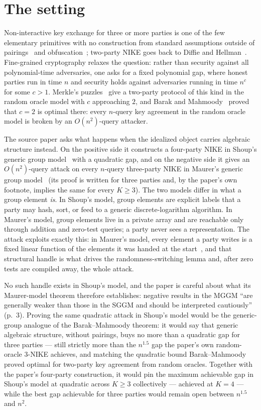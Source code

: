\documentclass{aicr-conjecture}
\begin{document}
\section{The setting}\label{sec:setting}

Non-interactive key exchange for three or more parties is one of the few
elementary primitives with no construction from standard assumptions
outside of pairings~\cite{Jou00} and obfuscation~\cite{BZ14}; two-party
NIKE goes back to Diffie and Hellman~\cite{DH76}. Fine-grained
cryptography relaxes the question: rather than security against all
polynomial-time adversaries, one asks for a fixed polynomial gap, where
honest parties run in time $n$ and security holds against adversaries
running in time $n^{c}$ for some $c > 1$. Merkle's puzzles~\cite{Mer78}
give a two-party protocol of this kind in the random oracle model with
$c$ approaching $2$, and Barak and Mahmoody~\cite{BM09,BM17} proved that
$c = 2$ is optimal there: every $n$-query key agreement in the random
oracle model is broken by an $O(n^{2})$-query attacker.

The source paper asks what happens when the idealized object carries
algebraic structure instead. On the positive side it constructs a
four-party NIKE in Shoup's generic group model~\cite{Sho97} with a
quadratic gap, and on the negative side it gives an $O(n^{2})$-query
attack on every $n$-query three-party NIKE in Maurer's generic group
model~\cite{Mau05} (its proof is written for three parties and, by the
paper's own footnote, implies the same for every $K \ge 3$). The two
models differ in what a group element \emph{is}. In Shoup's model, group
elements are explicit labels that a party may hash, sort, or feed to a
generic discrete-logarithm algorithm. In Maurer's model, group elements
live in a private array and are reachable only through addition and
zero-test queries; a party never sees a representation. The attack
exploits exactly this: in Maurer's model, every element a party writes
is a fixed linear function of the elements it was handed at the
start~\cite{FKL17}, and that structural handle is what drives the
randomness-switching lemma and, after zero tests are compiled away, the
whole attack.

No such handle exists in Shoup's model, and the paper is careful about
what its Maurer-model theorem therefore establishes: negative results in
the MGGM ``are generally weaker than those in the SGGM and should be
interpreted cautiously''~\cite{Zha22,DHH21} (p.~3). Proving the same
quadratic attack in Shoup's model would be the generic-group analogue of
the Barak--Mahmoody theorem: it would say that generic algebraic
structure, without pairings, buys no more than a quadratic gap for three
parties --- still strictly more than the $n^{1.5}$ gap the paper's own
random-oracle 3-NIKE achieves, and matching the quadratic bound
Barak--Mahmoody proved optimal for two-party key agreement from random
oracles. Together with the paper's four-party construction, it would pin
the maximum achievable gap in Shoup's model at quadratic across
$K \ge 3$ collectively --- achieved at $K = 4$ --- while the best gap
achievable for three parties would remain open between $n^{1.5}$ and
$n^{2}$.
\end{document}
